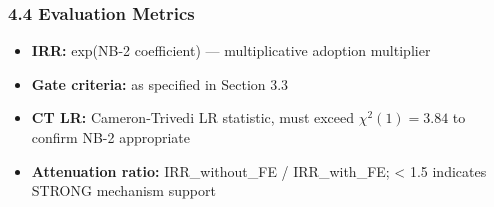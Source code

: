 \subsubsection{4.4 Evaluation Metrics}

\begin{itemize}
\item \textbf{IRR:} exp(NB-2 coefficient) --- multiplicative adoption multiplier
\item \textbf{Gate criteria:} as specified in Section 3.3
\item \textbf{CT LR:} Cameron-Trivedi LR statistic, must exceed $\chi^{2}(1)=3.84$ to confirm NB-2 appropriate
\item \textbf{Attenuation ratio:} IRR\_without\_FE / IRR\_with\_FE; < 1.5 indicates STRONG mechanism support
\end{itemize}

